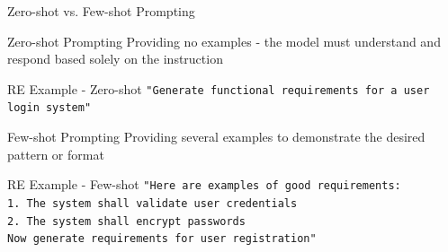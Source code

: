 \documentclass{beamer}
\begin{document}
\begin{frame}{Zero-shot vs. Few-shot Prompting}
    \begin{block}{Zero-shot Prompting}
        Providing no examples - the model must understand and respond based solely on the instruction
    \end{block}
    
    \begin{exampleblock}{RE Example - Zero-shot}
        \texttt{"Generate functional requirements for a user login system"}
    \end{exampleblock}
    
    \begin{block}{Few-shot Prompting}
        Providing several examples to demonstrate the desired pattern or format
    \end{block}
    
    \begin{exampleblock}{RE Example - Few-shot}
        \texttt{"Here are examples of good requirements: \\1. The system shall validate user credentials\\2. The system shall encrypt passwords\\ Now generate requirements for user registration"}
    \end{exampleblock}
\end{frame}
\end{document}
